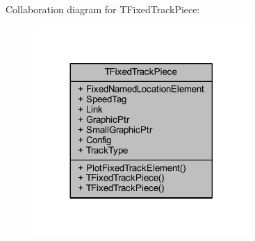 Collaboration diagram for T\+Fixed\+Track\+Piece\+:\nopagebreak
\begin{figure}[H]
\begin{center}
\leavevmode
\includegraphics[width=233pt]{class_t_fixed_track_piece__coll__graph}
\end{center}
\end{figure}
